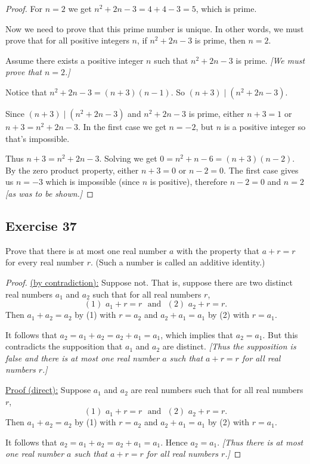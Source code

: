 \documentclass[14pt]{extarticle}
\begin{document}
\begin{proof}
    For $n = 2$ we get $n^2 + 2n - 3 = 4 + 4 - 3 = 5$, which is prime.

    Now we need to prove that this prime number is unique. In other words, we must prove that for all positive integers $n$, if $n^2 + 2n - 3$ is prime, then $n=2$.

    Assume there exists a positive integer $n$ such that $n^2 + 2n - 3$ is prime. {\it[We must prove that $n = 2$.]}

    Notice that $n^2 + 2n - 3 = (n+3)(n-1)$. So $(n+3) \mid (n^2 + 2n - 3)$.

    Since $(n+3) \mid (n^2 + 2n - 3)$ and $n^2 + 2n - 3$ is prime, either $n+3 = 1$ or $n+3 = n^2 + 2n - 3$. In the first case we get $n = -2$, but $n$ is a positive integer so that's impossible.

    Thus $n+3 = n^2 + 2n - 3$. Solving we get $0 = n^2 + n - 6 = (n+3)(n-2)$. By the zero product property, either $n+3 = 0$ or $n-2 = 0$. The first case gives us $n = -3$ which is impossible (since $n$ is positive), therefore $n-2 = 0$ and $n=2$ {\it [as was to be shown.]}
\end{proof}

\subsection{Exercise 37}
Prove that there is at most one real number $a$ with the property that $a + r = r$ for every real number $r$. (Such a number is called an additive identity.)

\begin{proof}
    \underline{(by contradiction):} Suppose not. That is, suppose there are two distinct real numbers $a_1$ and $a_2$ such that for all real numbers $r$,
    \[
        (1) \,\, a_1 + r = r \,\,\text{ and }\,\, (2) \,\, a_2 + r = r.
    \]
    Then $a_1 + a_2 = a_2$ by (1) with $r = a_2$ and $a_2 + a_1 = a_1$ by (2) with $r = a_1$.

    It follows that $a_2 = a_1 + a_2 = a_2 + a_1 = a_1$, which implies that $a_2 = a_1$. But this contradicts the supposition that $a_1$ and $a_2$ are distinct. {\it [Thus the supposition is false and there is at most one real number $a$ such that $a + r = r$ for all real numbers $r$.]}

    \underline{Proof (direct):} Suppose $a_1$ and $a_2$ are real numbers such that for all real numbers $r$,
    \[
        (1) \,\, a_1 + r = r \,\,\text{ and }\,\, (2) \,\, a_2 + r = r.
    \]
    Then $a_1 + a_2 = a_2$ by (1) with $r = a_2$ and $a_2 + a_1 = a_1$ by (2) with $r = a_1$.

    It follows that $a_2 = a_1 + a_2 = a_2 + a_1 = a_1$. Hence $a_2 = a_1$. {\it [Thus there is at most one real number $a$ such that $a + r = r$ for all real numbers $r$.]}
\end{proof}
\end{document}
